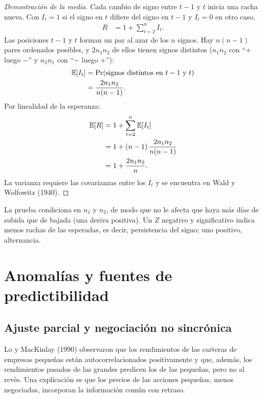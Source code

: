 \begin{proof}[Demostración de la media]
Cada cambio de signo entre $t-1$ y $t$ inicia una racha nueva. Con $I_t=1$ si el signo en $t$ difiere del signo
en $t-1$ y $I_t=0$ en otro caso,
\begin{align*}
  R &= 1+\sum_{t=2}^{n}I_t .
\end{align*}
Las posiciones $t-1$ y $t$ forman un par al azar de los $n$ signos. Hay $n(n-1)$ pares ordenados posibles, y
$2n_1n_2$ de ellos tienen signos distintos ($n_1n_2$ con ``$+$ luego $-$'' y $n_2n_1$ con ``$-$ luego $+$''):
\begin{align*}
  \mathbb{E}[I_t] &= \Pr(\text{signos distintos en } t-1 \text{ y } t)\\
          &= \frac{2n_1n_2}{n(n-1)} .
\end{align*}
Por linealidad de la esperanza:
\begin{align*}
  \mathbb{E}[R] &= 1+\sum_{t=2}^{n}\mathbb{E}[I_t]\\
        &= 1+(n-1)\,\frac{2n_1n_2}{n(n-1)}\\
        &= 1+\frac{2n_1n_2}{n} .
\end{align*}
La varianza requiere las covarianzas entre los $I_t$ y se encuentra en Wald y Wolfowitz (1940).
\end{proof}

La prueba condiciona en $n_1$ y $n_2$, de modo que no le afecta que haya más días de subida que de bajada (una
deriva positiva). Un $Z$ negativo y significativo indica menos rachas de las esperadas, es decir, persistencia
del signo; uno positivo, alternancia.

\section{Anomalías y fuentes de predictibilidad}

\subsection{Ajuste parcial y negociación no sincrónica}

Lo y MacKinlay (1990) observaron que los rendimientos de las carteras de empresas pequeñas están
autocorrelacionados positivamente y que, además, los rendimientos pasados de las grandes predicen los de las
pequeñas, pero no al revés. Una explicación es que los precios de las acciones pequeñas, menos negociadas,
incorporan la información común con retraso.

